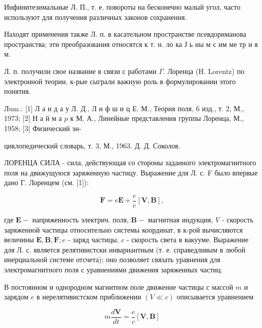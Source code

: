 \documentclass[10pt]{article}
\begin{document}
Инфинитезимальные Л. П., т. е. повороты на бесконечно малый угол, часто используют для получения различных законов сохранения.



Находят применения также Л. п. в касательном пространстве псевдориманова пространства; эти преобразования относятся к т. н. ло ка Ј ь ны м с им ме тр и я м.



Л. п. получили свое название в связи с работами $\Gamma$. Лоренца (H. Lorentz) по электронной теории, к-рые сыграли важную роль в формулировании этого понятия.



Лum.: [1] Л а н д а у Л. Д., Л и ф ш и ц Е. М., Теория поля, 6 изд., т. 2, М., 1973; [2] Н а й м а $p$ к М. А., Линейные представления группы Лоренца, М., 1958; [3] Физический эн-

циклопедический словарь, т. 3, М., 1963. Д. Д. Соколов.



ЛОРЕНЦА СИЛА - сила, действующая со стороны заданного электромагнитного поля на движущуюся заряженную частицу. Выражение для Л. с. F было впервые дано Г. Лоренцем (см. [1]):



\[

\boldsymbol{F}=e \boldsymbol{E}+\frac{e}{c}[\boldsymbol{V}, \boldsymbol{B}],

\]



где $\boldsymbol{E}-$ напряженность электрич. поля, $\boldsymbol{B}-$ магнитная индукция, $V$ - скорость заряженной частицы относительно системы координат, в к-рой вычисляются величины $\boldsymbol{E}, \boldsymbol{B}, \boldsymbol{F} ; e$ - заряд частицы, $c$ - скорость света в вакууме. Выражение для Л. с. является релятивистски инвариантным (т. е. справедливым в любой инерциальной системе отсчета); оно позволяет связать уравнения для электромагнитного поля с уравнениями движения заряженных частиц.



В постоянном и однородном магнитном поле движение частицы с массой $m$ и зарядом $e$ в нерелятивистском приближении $(V \ll c)$ описывается уравнением



\[

m \frac{d \boldsymbol{V}}{d t}=\frac{e}{c}[\boldsymbol{V}, \boldsymbol{B}]

\]
\end{document}

